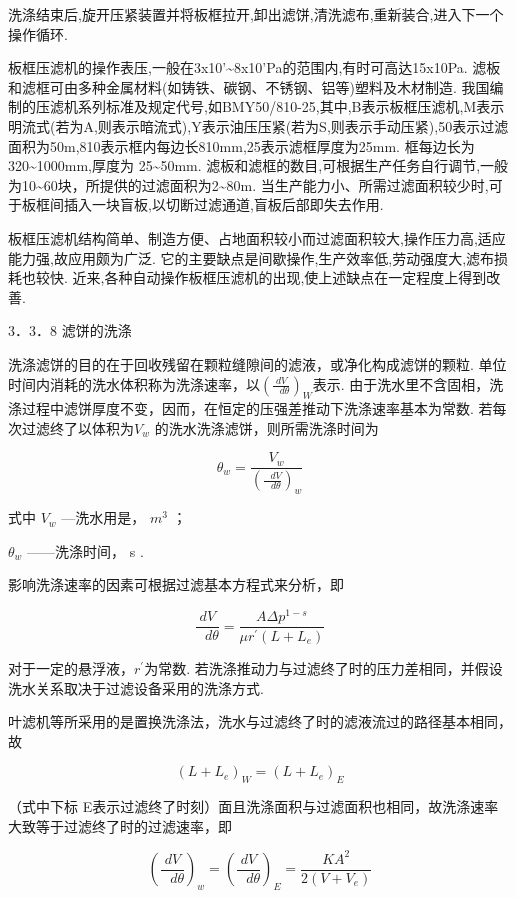 \documentclass[
]{article}
\begin{document}
洗涤结束后,旋开压紧装置并将板框拉开,卸出滤饼,清洗滤布,重新装合,进入下一个操作循环. 

板框压滤机的操作表压,一般在3x10'\textasciitilde8x10'Pa的范围内,有时可高达15x10\textquotesingle Pa. 滤板和滤框可由多种金属材料(如铸铁、碳钢、不锈钢、铝等)塑料及木材制造. 我国编制的压滤机系列标准及规定代号,如BMY50/810-25,其中,B表示板框压滤机,M表示明流式(若为A,则表示暗流式),Y表示油压压紧(若为S,则表示手动压紧),50表示过滤面积为50m\textquotesingle,810表示框内每边长810mm,25表示滤框厚度为25mm. 框每边长为320\textasciitilde1000mm,厚度为
25\textasciitilde50mm. 滤板和滤框的数目,可根据生产任务自行调节,一般为10\textasciitilde60块，所提供的过滤面积为2\textasciitilde80m. 当生产能力小、所需过滤面积较少时,可于板框间插入一块盲板,以切断过滤通道,盲板后部即失去作用. 

板框压滤机结构简单、制造方便、占地面积较小而过滤面积较大,操作压力高,适应能力强,故应用颇为广泛. 它的主要缺点是间歇操作,生产效率低,劳动强度大,滤布损耗也较快. 近来,各种自动操作板框压滤机的出现,使上述缺点在一定程度上得到改善. 

3．3．8 滤饼的洗涤

洗涤滤饼的目的在于回收残留在颗粒缝隙间的滤液，或净化构成滤饼的颗粒. 单位时间内消耗的洗水体积称为洗涤速率，以\(\left( \frac{dV}{\text{\ }d\theta} \right)_{W}\)表示. 由于洗水里不含固相，洗涤过程中滤饼厚度不变，因而，在恒定的压强差推动下洗涤速率基本为常数. 若每次过滤终了以体积为\(V_{w}\) 的洗水洗涤滤饼，则所需洗涤时间为

\[\theta_{w} = \frac{V_{w}}{\left( \frac{\text{\ }dV}{\text{\ }d\theta} \right)_{w}}\]

式中 \(V_{w}\) ---洗水用是， \(m^{3}\) ；

\(\theta_{w}\) ------洗涤时间， s . 

影响洗涤速率的因素可根据过滤基本方程式来分析，即

\[\frac{dV}{\text{\ }d\theta} = \frac{A\Delta p^{1 - s}}{\mu r^{'}\left( L + L_{e} \right)}\]

对于一定的悬浮液，\(r^{'}\)为常数. 若洗涤推动力与过滤终了时的压力差相同，并假设洗水关系取决于过滤设备采用的洗涤方式. 

叶滤机等所采用的是置换洗涤法，洗水与过滤终了时的滤液流过的路径基本相同，故

\[\left( L + L_{e} \right)_{W} = \left( L + L_{e} \right)_{E}\]

（式中下标 E表示过滤终了时刻）面且洗涤面积与过滤面积也相同，故洗涤速率大致等于过滤终了时的过滤速率，即

\[\left( \frac{dV}{\text{\ }d\theta} \right)_{w} = \left( \frac{dV}{\text{\ }d\theta} \right)_{E} = \frac{KA^{2}}{2\left( V + V_{e} \right)}\]
\end{document}
